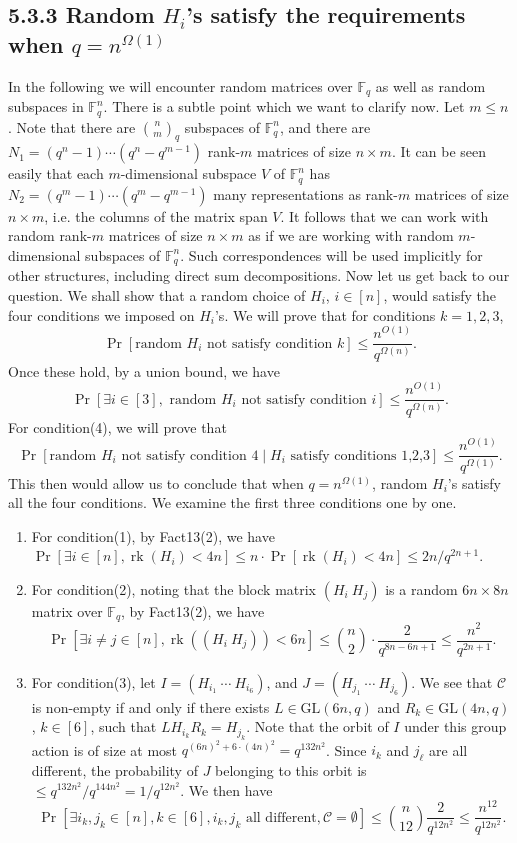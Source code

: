 \documentclass[10pt,a4paper]{article}
\begin{document}
\subsection*{5.3.3 Random $H_i$'s satisfy the requirements when $q=n^{\Omega(1)}$}
In the following we will encounter random matrices over $\mathbb F_q$ as well as random subspaces in $\mathbb F_q^n$. There is a subtle point which we want to clarify now. Let $m\le n$. Note that there are $\binom nm_q$ subspaces of $\mathbb F_q^n$, and there are $N_1=(q^n-1)\cdots(q^n-q^{m-1})$ rank-$m$ matrices of size $n\times m$. It can be seen easily that each $m$-dimensional subspace $V$ of $\mathbb F_q^n$ has $N_2=(q^m-1)\cdots(q^m-q^{m-1})$ many representations as rank-$m$ matrices of size $n\times m$, i.e. the columns of the matrix span $V$. It follows that we can work with random rank-$m$ matrices of size $n\times m$ as if we are working with random $m$-dimensional subspaces of $\mathbb F_q^n$. Such correspondences will be used implicitly for other structures, including direct sum decompositions.
Now let us get back to our question. We shall show that a random choice of $H_i$, $i\in[n]$, would satisfy the four conditions we imposed on $H_i$'s. We will prove that for conditions $k=1,2,3$,
\[\Pr[\text{random }H_i\text{ not satisfy condition }k]\le\frac{n^{O(1)}}{q^{\Omega(n)}}.\]
Once these hold, by a union bound, we have
\[\Pr[\exists i\in[3],\text{ random }H_i\text{ not satisfy condition }i]\le\frac{n^{O(1)}}{q^{\Omega(n)}}.\]
For condition(4), we will prove that
\[\Pr[\text{random }H_i\text{ not satisfy condition 4}\mid H_i\text{ satisfy conditions 1,2,3}]\le\frac{n^{O(1)}}{q^{\Omega(1)}}.\]
This then would allow us to conclude that when $q=n^{\Omega(1)}$, random $H_i$'s satisfy all the four conditions. We examine the first three conditions one by one.
\begin{enumerate}
\item For condition(1), by Fact13(2), we have $\Pr[\exists i\in[n],\operatorname{rk}(H_i)<4n]\le n\cdot\Pr[\operatorname{rk}(H_i)<4n]\le2n/q^{2n+1}$.
\item For condition(2), noting that the block matrix $(H_i\ H_j)$ is a random $6n\times8n$ matrix over $\mathbb F_q$, by Fact13(2), we have
\[\Pr[\exists i\ne j\in[n],\operatorname{rk}((H_i\ H_j))<6n]\le\binom n2\cdot\frac2{q^{8n-6n+1}}\le\frac{n^2}{q^{2n+1}}.\]
\item For condition(3), let $I=(H_{i_1}\ \cdots\ H_{i_6})$, and $J=(H_{j_1}\ \cdots\ H_{j_6})$. We see that $\mathcal C$ is non-empty if and only if there exists $L\in\mathrm{GL}(6n,q)$ and $R_k\in\mathrm{GL}(4n,q)$, $k\in[6]$, such that $LH_{i_k}R_k=H_{j_k}$. Note that the orbit of $I$ under this group action is of size at most $q^{(6n)^2+6\cdot(4n)^2}=q^{132n^2}$. Since $i_k$ and $j_\ell$ are all different, the probability of $J$ belonging to this orbit is $\le q^{132n^2}/q^{144n^2}=1/q^{12n^2}$. We then have
\[\Pr[\exists i_k,j_k\in[n],k\in[6],i_k,j_k\text{ all different},\mathcal C=\emptyset]\le\binom n{12}\frac2{q^{12n^2}}\le\frac{n^{12}}{q^{12n^2}}.\]
\end{enumerate}
\end{document}
